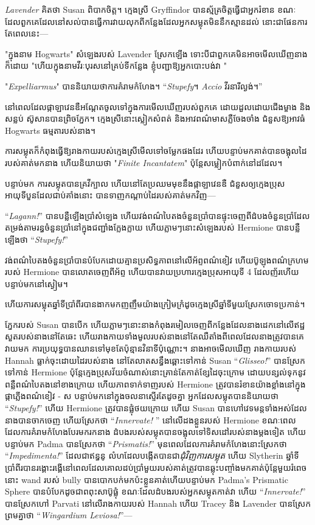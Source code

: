 {{{\emph{Lavender} គិតថា Susan ពិបាកចិត្ត។ ក្មេងស្រី Gryffindor បានស្ម័គ្រចិត្ដធ្វើជាអ្នករំខាន ខណៈដែលពួកគេដែលនៅសល់បានធ្វើការវាយលុកពីកន្លែងដែលអ្នកសម្លុតមិននឹកស្មានដល់ នោះជាផែនការ តែពេលនេះ—

"ក្នុងនាម Hogwarts" សំឡេងរបស់ Lavender ស្រែកឡើង ទោះបីជាពួកគេមិនអាចមើលឃើញនាងក៏ដោយ "ហើយក្នុងនាមវីរៈបុរសនៅគ្រប់ទីកន្លែង ខ្ញុំបញ្ជាឱ្យអ្នកបោះបង់វា "

"\emph{Expelliarmus}" បាននិយាយថាការគំរាមកំហែង។ “\emph{Stupefy}។ \emph{Accio} វីរនារីល្ងង់។”

នៅពេលដែលផ្កាឡាវេនឌឺអណ្តែតចូលទៅក្នុងការមើលឃើញរបស់ពួកគេ ដោយដួលដោយជើងម្ខាង និងសន្លប់ ស៊ូសានបានព្រិចភ្នែក។ ក្មេងស្រីនោះស្លៀកសំពត់ និងអាវពណ៌មាសភ្លឺចែងចាំង ជំនួសឱ្យអាវធំ Hogwarts ធម្មតារបស់នាង។

ការសម្លុតក៏កំពុងធ្វើឱ្យរាងកាយរបស់ក្មេងស្រីមើលទៅចម្លែកផងដែរ ហើយបន្ទាប់មកគាត់បានចង្អុលដៃរបស់គាត់មកនាង ហើយនិយាយថា "\emph{Finite Incantatem}" ប៉ុន្តែសម្លៀកបំពាក់នៅដដែល។

បន្ទាប់មក ការសម្លុតបានគ្រវីក្បាល ហើយនៅតែប្រឈមមុខនឹងផ្កាឡាវេនឌឺ ជំនួសឲ្យក្មេងប្រុសអាយុទីបួនដែលជាប់គាំងនោះ បានទាញកណ្តាប់ដៃរបស់គាត់មកវិញ—

“\emph{Lagann!}” បានបន្លឺឡើងប្រាំសំឡេង ហើយវង់ពណ៌បៃតងចំនួនប្រាំបានផ្ទុះចេញពីដំបងចំនួនប្រាំដែលតម្រង់តាមរន្ធចំនួនប្រាំនៅក្នុងជញ្ជាំងក្លែងក្លាយ ហើយភ្លាមៗនោះសំឡេងរបស់ Hermione បានបន្លឺឡើងថា “\emph{Stupefy!}”

វង់ពណ៌បៃតងចំនួនប្រាំបានបំបែកដោយគ្មានប្រសិទ្ធភាពនៅលើអ័ព្ទពណ៌ខៀវ ហើយប៊ូឡុងពណ៌ក្រហមរបស់ Hermione បានលោតចេញពីអ័ព្ទ ហើយបានវាយប្រហារក្មេងប្រុសអាយុទី 4 ដែលញ័រហើយបន្ទាប់មកនៅស្ងៀម។

ហើយ​ការ​សម្លុត​ឆ្នាំ​ទី​ប្រាំពីរ​បាន​ងាក​មក​ញញឹម​យ៉ាង​ក្រៀមក្រំ​ដូច​ក្មេង​ស្រី​ឆ្នាំ​ទី​មួយ​ស្រែក​ចោទ​ប្រកាន់។

\later

ភ្នែករបស់ Susan បានបើក ហើយភ្លាមៗនោះនាងកំពុងរមៀលចេញពីកន្លែងដែលនាងដេកនៅលើឥដ្ឋ សួតរបស់នាងនៅតែឆេះ ហើយរាងកាយទាំងមូលរបស់នាងនៅតែឈឺតាំងពីពេលដែលនាងត្រូវបានគេវាយមក ការប្រយុទ្ធបានឈានទៅមុខតែប៉ុន្មានវិនាទីប៉ុណ្ណោះ។ នាងអាចមើលឃើញ រាងកាយរបស់ Hannah ធ្លាក់ចុះដោយដៃរបស់នាង នៅតែលាតសន្ធឹងឆ្ពោះទៅកាន់ Susan “\emph{Glisseo!}” បានស្រែកទៅកាន់ Hermione ប៉ុន្តែក្មេងប្រុសវ័យចំណាស់នោះគ្រាន់តែកាត់ខ្សែដៃចុះក្រោម ដោយបន្សល់ទុកនូវពន្លឺពណ៌បៃតងនៅខាងក្រោយ ហើយភាពទាក់ទាញរបស់ Hermione ត្រូវបានរំខានយ៉ាងខ្លាំងនៅក្នុង ផ្កាភ្លើងពណ៌ខៀវ - ស បន្ទាប់មកនៅក្នុងចលនាស្ទើរតែដូចគ្នា អ្នកដែលសម្លុតបាននិយាយថា “\emph{Stupefy!}” ហើយ Hermione ត្រូវបានផ្លុំថយក្រោយ ហើយ Susan បានហៅវេទមន្តទាំងអស់ដែលនាងបានចាកចេញ ហើយស្រែកថា “\emph{Innervate!} ” នៅលើដងខ្លួនរបស់ Hermione ខណៈពេលដែលការគំរាមកំហែងបែរមករកនាង ដំបងរបស់សម្លុតបានចង្អុលទៅទិសដៅរបស់នាងម្តងទៀត ហើយបន្ទាប់មក Padma បានស្រែកថា “\emph{Prismatis!}” មុនពេលដែលការគំរាមកំហែងនោះស្រែកថា “\emph{Impedimenta!}” ដែលជាឥន្ធនូ លំហដែលបង្កើតបានជា\emph{ជុំវិញការសម្លុត} ហើយ Slytherin ឆ្នាំទីប្រាំពីរបានរង្គោះរង្គើនៅពេលដែលគោលដប់ប្រាំមួយរបស់គាត់ត្រូវបានឆ្លុះបញ្ចាំងមកគាត់ប៉ុន្តែមួយរំពេចនោះ wand របស់ bully បានបោកបក់មកប៉ះខ្លួនគាត់ហើយបន្ទាប់មក Padma's Prismatic Sphere បានបំបែកដូចជាពពុះសាប៊ូផ្លុំ ខណៈ​ដែល​ដំបង​របស់​អ្នក​សម្លុត​កាត់​វា ហើយ “\emph{Innervate!}” បាន​ស្រែក​ហៅ Parvati នៅ​លើ​រាងកាយ​របស់ Hannah ហើយ Tracey និង Lavender បាន​ស្រែក​ព្រម​គ្នា​ថា “\emph{Wingardium Leviosa!}”—

}}}
